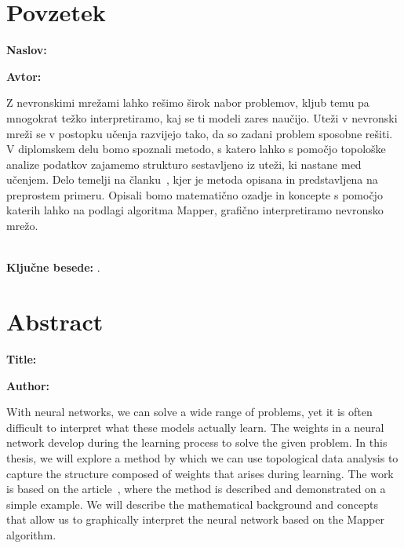 \clearemptydoublepage{}

\chapter*{Povzetek}

\noindent\textbf{Naslov:} \ttitle{}
\bigskip

\noindent\textbf{Avtor:} \tauthor{}
\bigskip

\noindent Z nevronskimi mrežami lahko rešimo širok nabor problemov, kljub temu pa mnogokrat težko interpretiramo, kaj se ti modeli zares naučijo. Uteži v nevronski mreži se v postopku učenja razvijejo tako, da so zadani problem sposobne rešiti. V diplomskem delu bomo spoznali metodo, s katero lahko s pomočjo topološke analize podatkov zajamemo strukturo sestavljeno iz uteži, ki nastane med učenjem. Delo temelji na članku~\cite{Gabella2021}, kjer je metoda opisana in predstavljena na preprostem primeru. Opisali bomo matematično ozadje in koncepte s pomočjo katerih lahko na podlagi algoritma Mapper, grafično interpretiramo nevronsko mrežo.  \\ \\


\bigskip

\noindent\textbf{Ključne besede:} \tkeywords.
\clearemptydoublepage{}

\chapter*{Abstract}

\noindent\textbf{Title:} \ttitleEn{}
\bigskip

\noindent\textbf{Author:} \tauthor{}
\bigskip

\noindent With neural networks, we can solve a wide range of problems, yet it is often difficult to interpret what these models actually learn. The weights in a neural network develop during the learning process to solve the given problem. In this thesis, we will explore a method by which we can use topological data analysis to capture the structure composed of weights that arises during learning. The work is based on the article~\cite{Gabella2021}, where the method is described and demonstrated on a simple example. We will describe the mathematical background and concepts that allow us to graphically interpret the neural network based on the Mapper algorithm.
\bigskip

